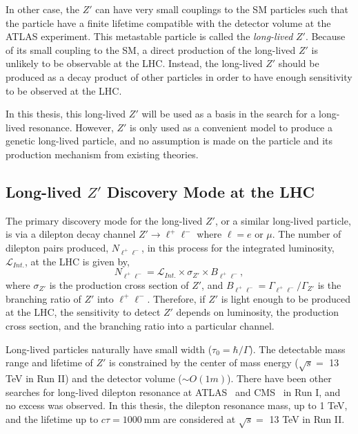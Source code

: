 In other case, the $Z'$ can have very small couplings to the SM particles such that the particle have a finite lifetime compatible with the detector volume at the ATLAS experiment. This metastable particle is called the \textit{long-lived} $Z'$. Because of its small coupling to the SM, a direct production of the long-lived $Z'$ is unlikely to be observable at the LHC. Instead, the long-lived $Z'$ should be produced as a decay product of other particles in order to have enough sensitivity to be observed at the LHC. 

In this thesis, this long-lived $Z'$ will be used as a basis in the search for a long-lived resonance. However, $Z'$ is only used as a convenient model to produce a genetic long-lived particle, and no assumption is made on the particle and its production mechanism from existing theories.


\subsection{Long-lived \texorpdfstring{$Z'$}{Z'} Discovery Mode at the LHC}
\label{sec:intro:zprime_discovery}

The primary discovery mode for the long-lived $Z'$, or a similar long-lived particle, is via a dilepton decay channel $Z' \rightarrow  \ell^{+}\ell^{-}$ where $\ell= e$ or $\mu$. The number of dilepton pairs produced, $N_{\ell^{+}\ell^{-}}$, in this process for the integrated luminosity, $\mathcal{L}_{Int.}$, at the LHC is given by,
%
\begin{equation}
\label{eq:cross_section}
N_{\ell^{+}\ell^{-}} = \mathcal{L}_{Int.} \times \sigma_{Z'} \times B_{\ell^{+}\ell^{-}},
\end{equation}
%
where $\sigma_{Z'}$ is the production cross section of $Z'$, and $B_{\ell^{+}\ell^{-}} = \Gamma_{\ell^{+}\ell^{-}} / \Gamma_{Z'}$ is the branching ratio of $Z'$ into $\ell^{+}\ell^{-}$. Therefore, if $Z'$ is light enough to be produced at the LHC, the sensitivity to detect $Z'$ depends on luminosity, the production cross section, and the branching ratio into a particular channel.

Long-lived particles naturally have small width ($\tau_{0} = \hbar / \Gamma$). The detectable mass range and lifetime of $Z'$ is constrained by the center of mass energy ($\sqrt{s} = $ 13 TeV in Run II) and the detector volume ($\sim O(1m)$). There have been other searches for long-lived dilepton resonance at ATLAS~\cite{Aad:2010949} and CMS~\cite{Chatrchyan:1493239} in Run I, and no excess was observed. In this thesis, the dilepton resonance mass, up to 1 TeV, and the lifetime up to $c\tau= 1000~\si{\mm}$ are considered at $\sqrt{s}=$ 13 TeV in Run II.

